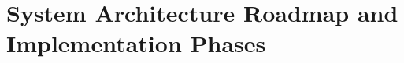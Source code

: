 \documentclass[11pt,a4paper]{article}
\begin{document}
\newpage


\newpage


\newpage


\newpage


\newpage


\newpage


\newpage


\newpage


\newpage

\section{System Architecture Roadmap and Implementation Phases}
\label{sec:roadmap}
\end{document}
